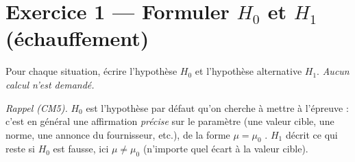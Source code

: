 \vspace{0.8cm}

\section*{Exercice 1 --- Formuler $H_0$ et $H_1$ (échauffement)}

Pour chaque situation, écrire l'hypothèse $H_0$ et l'hypothèse alternative $H_1$. \emph{Aucun calcul n'est demandé.}

\smallskip

\textit{Rappel (CM5).} $H_0$ est l'hypothèse \og par défaut \fg{} qu'on cherche à mettre à l'épreuve : c'est en général une affirmation \emph{précise} sur le paramètre (une valeur cible, une norme, une annonce du fournisseur, etc.), de la forme \og $\mu = \mu_0$ \fg. $H_1$ décrit ce qui reste si $H_0$ est fausse, ici \og $\mu \neq \mu_0$ \fg{} (n'importe quel écart à la valeur cible).

